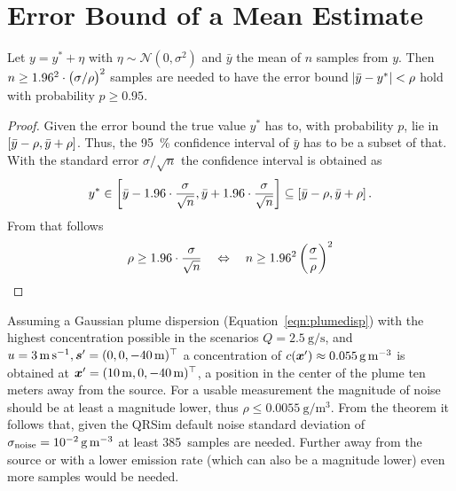 \chapter{Error Bound of a Mean Estimate}\label{sec:decnoise}
\begin{theorem}
    Let $y = y^* + \eta$ with $\eta \sim \mathcal N(0, \sigma^2)$ and $\bar y$ 
    the mean of $n$ samples from $y$. Then $n \geq 1.96^2 \cdot \del{\sigma 
        / \rho}^2$ samples are needed to have the error bound $\abs{\bar{y} 
        - y^*} < \rho$ hold with probability $p \geq 0.95$.
\end{theorem}

\begin{proof}
    Given the error bound the true value $y^*$ has to, with probability $p$, lie 
    in $\intcc{\bar y - \rho, \bar y + \rho}$. Thus, the \SI{95}{\percent} 
    confidence interval of $\bar y$ has to be a subset of that. With the 
    standard error $\sigma / \sqrt{n}$ the confidence interval is obtained as
    \begin{equation*}
        y^* \in \intcc{\bar y - 1.96 \cdot \frac{\sigma}{\sqrt{n}}, \bar{y} 
            + 1.96 \cdot \frac{\sigma}{\sqrt{n}}} \subseteq \intcc{\bar{y} 
            - \rho, \bar y + \rho} \text{.}
    \end{equation*}
    From that follows
    \begin{equation*}
        \rho \geq 1.96 \cdot \frac{\sigma}{\sqrt{n}} \quad\Leftrightarrow\quad 
        n \geq 
        1.96^2 \del{\frac{\sigma}{\rho}}^2
    \end{equation*}
\end{proof}

Assuming a Gaussian plume dispersion (Equation~\ref{eqn:plumedisp}) with the 
highest concentration possible in the scenarios $Q 
= \SI{2.5}{\gram\per\second}$, and
$u = \SI{3}{\meter\per\second}, \bm{s}' = (0, 0, \SI{-40}{\meter})^{\top}$ 
a concentration of $c(\bm{x}') \approx \SI{0.055}{\gram\per\meter\cubed}$ is 
obtained at $\bm{x}' = (\SI{10}{\meter}, 0, \SI{-40}{\meter})^{\top}$, a position in 
the center of the plume ten meters away from the source. For a usable 
measurement the magnitude of noise should be at least a magnitude lower, thus 
$\rho \leq \SI{0.0055}{\gram\per\meter\cubed}$. From the theorem it follows 
that, given the QRSim default noise standard deviation of $\sigma_{\mathrm{noise}} 
= \SI{e-2}{\gram\per\meter\cubed}$ at least 385~samples are needed. Further away 
from the source or with a lower emission rate (which can also be a magnitude 
lower) even more samples would be needed.

